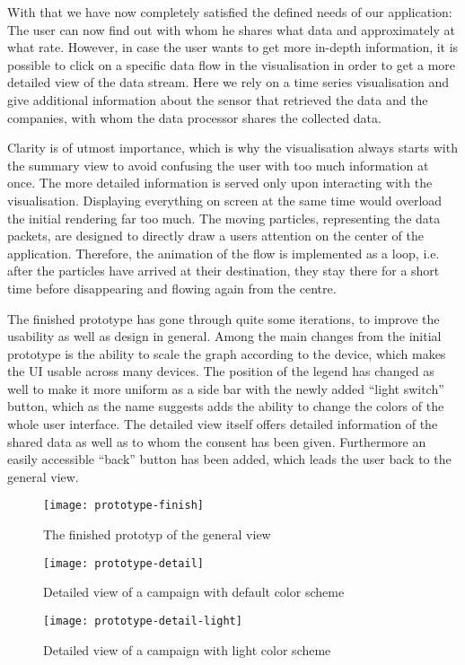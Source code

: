 \documentclass[../paper.tex]{subfiles}
\begin{document}
  With that we have now completely satisfied the defined needs of our application:
  The user can now find out with whom he shares what data and approximately at what
  rate. However, in case the user wants to get more in-depth information, it is
  possible to click on a specific data flow in the visualisation in order
  to get a more detailed view of the data stream. Here we rely on a time series
  visualisation and give additional information about the sensor that retrieved
  the data and the companies, with whom the data processor shares the collected data.

  Clarity is of utmost importance, which is why the visualisation always starts
  with the summary view to avoid confusing the user with too much information
  at once. The more detailed information is served only upon interacting with
  the visualisation. Displaying everything on screen at the same time would
  overload the initial rendering far too much. The moving particles, representing the
  data packets, are designed to directly draw a users attention on the center of the
  application. Therefore, the animation of the flow is implemented as a loop, i.e.
  after the particles have arrived at their destination, they stay there for a short
  time before disappearing and flowing again from the centre.

  The finished prototype has gone through quite some iterations, to improve
  the usability as well as design in general. Among the main changes from the
  initial prototype is the ability to scale the graph according to the device, which
  makes the UI usable across many devices. The position of the legend has changed
  as well to make it more uniform as a side bar with the newly added \enquote{light switch}
  button, which as the name suggests adds the ability to change the colors of
  the whole user interface. The detailed view itself offers detailed information
  of the shared data as well as to whom the consent has been given. Furthermore
  an easily accessible \enquote{back} button has been added, which leads the user back
  to the general view.

  \begin{figure}[H]
    \centering
    \texttt{[image: prototype-finish]}
    \caption{The finished prototyp of the general view}
    \label{fig:prototype-finish}
  \end{figure}

  \begin{figure}[H]
    \centering
    \texttt{[image: prototype-detail]}
    \caption{Detailed view of a campaign with default color scheme}
    \label{fig:prototype-detail}
  \end{figure}

  \begin{figure}[H]
    \centering
    \texttt{[image: prototype-detail-light]}
    \caption{Detailed view of a campaign with light color scheme}
    \label{fig:prototype-detail-light}
  \end{figure}
\end{document}
